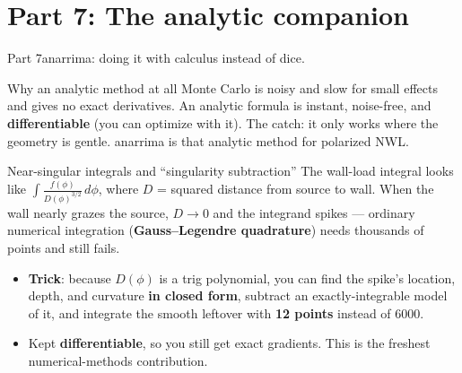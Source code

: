 \documentclass[11pt,aspectratio=169]{beamer}
\newcommand{\key}[1]{\textcolor{key}{\textbf{#1}}}
\begin{document}
\section{Part 7: The analytic companion}
\begin{frame}{Part 7}\Large anarrima: doing it with calculus instead of dice.\end{frame}

\begin{frame}{Why an analytic method at all}
Monte Carlo is noisy and slow for small effects and gives no exact derivatives. An analytic
formula is instant, noise-free, and \key{differentiable} (you can optimize with it). The
catch: it only works where the geometry is gentle. anarrima is that analytic method for
polarized NWL.
\end{frame}

\begin{frame}{Near-singular integrals and ``singularity subtraction''}
The wall-load integral looks like $\displaystyle\int \frac{f(\phi)}{D(\phi)^{3/2}}\,d\phi$,
where $D$ = squared distance from source to wall. When the wall nearly grazes the source,
$D\to 0$ and the integrand spikes --- ordinary numerical integration
(\key{Gauss--Legendre quadrature}) needs thousands of points and still fails.
\begin{itemize}
\item \key{Trick}: because $D(\phi)$ is a trig polynomial, you can find the spike's location,
depth, and curvature \key{in closed form}, subtract an exactly-integrable model of it, and
integrate the smooth leftover with \key{12 points} instead of 6000.
\item Kept \key{differentiable}, so you still get exact gradients. This is the freshest
numerical-methods contribution.
\end{itemize}
\end{frame}
\end{document}
